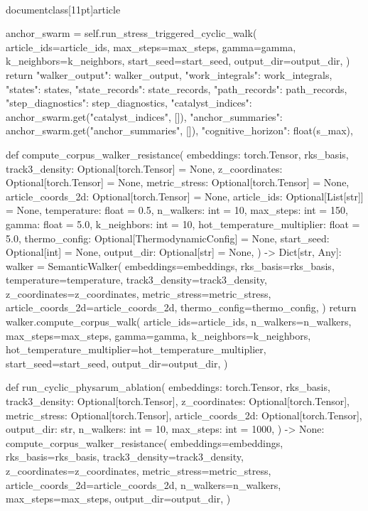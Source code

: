 \\documentclass[11pt]{article}
\begin{document}
\begin{CodeBlock}
        anchor_swarm = self.run_stress_triggered_cyclic_walk(
            article_ids=article_ids,
            max_steps=max_steps,
            gamma=gamma,
            k_neighbors=k_neighbors,
            start_seed=start_seed,
            output_dir=output_dir,
        )
        return {
            "walker_output": walker_output,
            "work_integrals": work_integrals,
            "states": states,
            "state_records": state_records,
            "path_records": path_records,
            "step_diagnostics": step_diagnostics,
            "catalyst_indices": anchor_swarm.get("catalyst_indices", []),
            "anchor_summaries": anchor_swarm.get("anchor_summaries", []),
            "cognitive_horizon": float(s_max),
        }


def compute_corpus_walker_resistance(
    embeddings: torch.Tensor,
    rks_basis,
    track3_density: Optional[torch.Tensor] = None,
    z_coordinates: Optional[torch.Tensor] = None,
    metric_stress: Optional[torch.Tensor] = None,
    article_coords_2d: Optional[torch.Tensor] = None,
    article_ids: Optional[List[str]] = None,
    temperature: float = 0.5,
    n_walkers: int = 10,
    max_steps: int = 150,
    gamma: float = 5.0,
    k_neighbors: int = 10,
    hot_temperature_multiplier: float = 5.0,
    thermo_config: Optional[ThermodynamicConfig] = None,
    start_seed: Optional[int] = None,
    output_dir: Optional[str] = None,
) -> Dict[str, Any]:
    walker = SemanticWalker(
        embeddings=embeddings,
        rks_basis=rks_basis,
        temperature=temperature,
        track3_density=track3_density,
        z_coordinates=z_coordinates,
        metric_stress=metric_stress,
        article_coords_2d=article_coords_2d,
        thermo_config=thermo_config,
    )
    return walker.compute_corpus_walk(
        article_ids=article_ids,
        n_walkers=n_walkers,
        max_steps=max_steps,
        gamma=gamma,
        k_neighbors=k_neighbors,
        hot_temperature_multiplier=hot_temperature_multiplier,
        start_seed=start_seed,
        output_dir=output_dir,
    )


def run_cyclic_physarum_ablation(
    embeddings: torch.Tensor,
    rks_basis,
    track3_density: Optional[torch.Tensor],
    z_coordinates: Optional[torch.Tensor],
    metric_stress: Optional[torch.Tensor],
    article_coords_2d: Optional[torch.Tensor],
    output_dir: str,
    n_walkers: int = 10,
    max_steps: int = 1000,
) -> None:
    compute_corpus_walker_resistance(
        embeddings=embeddings,
        rks_basis=rks_basis,
        track3_density=track3_density,
        z_coordinates=z_coordinates,
        metric_stress=metric_stress,
        article_coords_2d=article_coords_2d,
        n_walkers=n_walkers,
        max_steps=max_steps,
        output_dir=output_dir,
    )

\end{CodeBlock}
\end{document}
